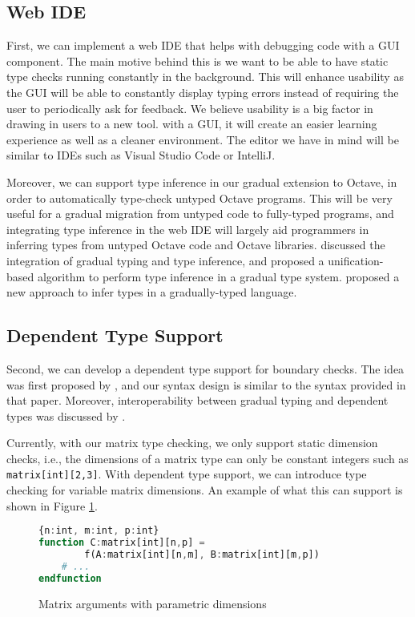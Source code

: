 \subsection{Web IDE}
First, we can implement a web IDE that helps with debugging code with a GUI component. The main motive behind this is we want to be able to have static type checks running constantly in the background. This will enhance usability as the GUI will be able to constantly display typing errors instead of requiring the user to periodically ask for feedback. We believe usability is a big factor in drawing in users to a new tool. with a GUI, it will create an easier learning experience as well as a cleaner environment. The editor we have in mind will be similar to IDEs such as Visual Studio Code or IntelliJ.

Moreover, we can support type inference in our gradual extension to Octave, in order to automatically type-check untyped Octave programs. This will be very useful for a gradual migration from untyped code to fully-typed programs, and integrating type inference in the web IDE will largely aid programmers in inferring types from untyped Octave code and Octave libraries. \citet{siek2008gradual} discussed the integration of gradual typing and type inference, and proposed a unification-based algorithm to perform type inference in a gradual type system. \citet{garcia2015principal} proposed a new approach to infer types in a gradually-typed language. 

\subsection{Dependent Type Support}
Second, we can develop a dependent type support for boundary checks. The idea was first proposed by \citet{xi1998eliminating}, and our syntax design is similar to the syntax provided in that paper. Moreover, interoperability between gradual typing and dependent types was discussed by \citet{lehmann2017gradual}.

Currently, with our matrix type checking, we only support static dimension checks, i.e., the dimensions of a matrix type can only be constant integers such as {\tt matrix[int][2,3]}. With dependent type support, we can introduce type checking for variable matrix dimensions. An example of what this can support is shown in Figure \ref{fig:variableDimensions}.

\begin{figure}[h]
    \begin{lstlisting}[language=octave]
{n:int, m:int, p:int}
function C:matrix[int][n,p] =
        f(A:matrix[int][n,m], B:matrix[int][m,p])
    # ...
endfunction
    \end{lstlisting}
    \caption[]{{Matrix arguments with parametric dimensions}}
    \label{fig:variableDimensions}
\end{figure}

